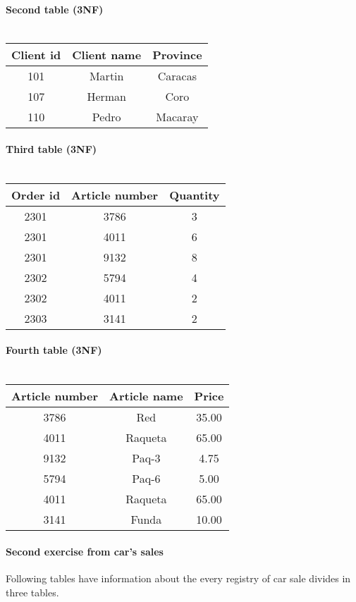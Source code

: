 \documentclass{article}
\begin{document}
\paragraph{Second table (3NF)\\\\}
\begin{tabular}{|c|c|c|}
Client id & Client name & Province\\
\hline
101 & Martin & Caracas\\
107 & Herman & Coro\\
110 & Pedro & Macaray\\
\end{tabular}
\paragraph{Third table (3NF)\\\\}
\begin{tabular}{|c|c|c|}
Order id & Article number & Quantity\\
\hline
2301 & 3786 & 3\\
2301 & 4011 & 6\\
2301 & 9132 & 8\\
2302 & 5794 & 4\\
2302 & 4011 & 2\\
2303 & 3141 & 2\\
\end{tabular}
\paragraph{Fourth table (3NF)\\\\}
\begin{tabular}{|c|c|c|}
Article number & Article name & Price\\
\hline
3786 & Red & 35.00\\
4011 & Raqueta & 65.00\\
9132 & Paq-3 & 4.75\\
5794 & Paq-6 & 5.00\\
4011 & Raqueta & 65.00\\
3141 & Funda & 10.00\\
\end{tabular}
\paragraph{Second exercise from car's sales\\}
Following tables have information about the every registry of car sale divides in three tables.
\end{document}
